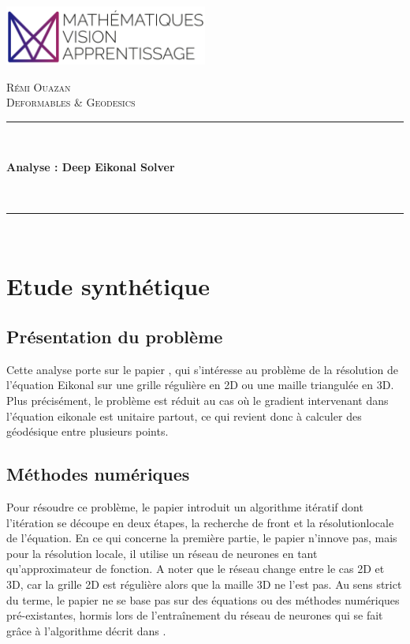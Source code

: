 \documentclass[11pt]{article} %
\begin{document}
\begin{titlepage}
\centering

\includegraphics[width=0.5\textwidth]{imgs/mva.png}
\par\vspace{1cm}

{\scshape\LARGE Rémi Ouazan \\ Deformables \& Geodesics \par} 
\vspace{0.5cm}

\rule{\linewidth}{0.2 mm} \\[0.4 cm]
{\huge\bfseries Analyse : Deep Eikonal Solver \par} \
\rule{\linewidth}{0.2 mm} \\[1.0 cm]

\tableofcontents

\end{titlepage}

\section{Etude synthétique}

\subsection{Présentation du problème}
Cette analyse porte sur le papier \cite{DeepEikonalSolver}, qui s'intéresse au problème de la résolution de l'équation Eikonal sur une grille régulière en 2D ou une maille triangulée en 3D. Plus précisément, le problème est réduit au cas où le gradient intervenant dans l'équation eikonale est unitaire partout, ce qui revient donc à calculer des géodésique entre plusieurs points.

\subsection{Méthodes numériques}
Pour résoudre ce problème, le papier introduit un algorithme itératif dont l'itération se découpe en deux étapes, la recherche de front et la résolutionlocale de l'équation. En ce qui concerne la première partie, le papier n'innove pas, mais pour la résolution locale, il utilise un réseau de neurones en tant qu'approximateur de fonction. A noter que le réseau change entre le cas 2D et 3D, car la grille 2D est régulière alors que la maille 3D ne l'est pas. Au sens strict du terme, le papier ne se base pas sur des équations ou des méthodes numériques pré-existantes, hormis lors de l'entraînement du réseau de neurones qui se fait grâce à l'algorithme décrit dans \cite{ExactGeodesics}.
\end{document}
